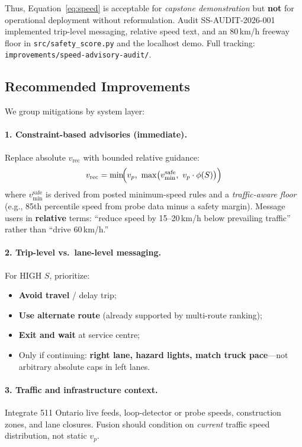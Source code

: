 \documentclass[11pt,a4paper]{article}
\begin{document}
Thus, Equation~\eqref{eq:speed} is acceptable for \emph{capstone demonstration} but \textbf{not} for operational deployment without reformulation. Audit SS-AUDIT-2026-001 implemented trip-level messaging, relative speed text, and an 80\,km/h freeway floor in \texttt{src/safety\_score.py} and the localhost demo. Full tracking: \texttt{improvements/speed-advisory-audit/}.

\subsection{Recommended Improvements}
\label{sec:improvements}

We group mitigations by system layer:

\paragraph{1. Constraint-based advisories (immediate).}
Replace absolute $v_{\text{rec}}$ with bounded relative guidance:
\begin{equation}
  v_{\text{rec}} = \min\!\Bigl(v_p,\ \max\bigl(v_{\min}^{\text{safe}},\ v_p \cdot \phi(S)\bigr)\Bigr)
\end{equation}
where $v_{\min}^{\text{safe}}$ is derived from posted minimum-speed rules and a \emph{traffic-aware floor} (e.g., 85th percentile speed from probe data minus a safety margin). Message users in \textbf{relative} terms: ``reduce speed by 15--20\,km/h below prevailing traffic'' rather than ``drive 60\,km/h.''

\paragraph{2. Trip-level vs.\ lane-level messaging.}
For HIGH $S$, prioritize:
\begin{itemize}[noitemsep]
  \item \textbf{Avoid travel} / delay trip;
  \item \textbf{Use alternate route} (already supported by multi-route ranking);
  \item \textbf{Exit and wait} at service centre;
  \item Only if continuing: \textbf{right lane, hazard lights, match truck pace}---not arbitrary absolute caps in left lanes.
\end{itemize}

\paragraph{3. Traffic and infrastructure context.}
Integrate 511 Ontario live feeds, loop-detector or probe speeds, construction zones, and lane closures. Fusion should condition on \emph{current} traffic speed distribution, not static $v_p$.
\end{document}
